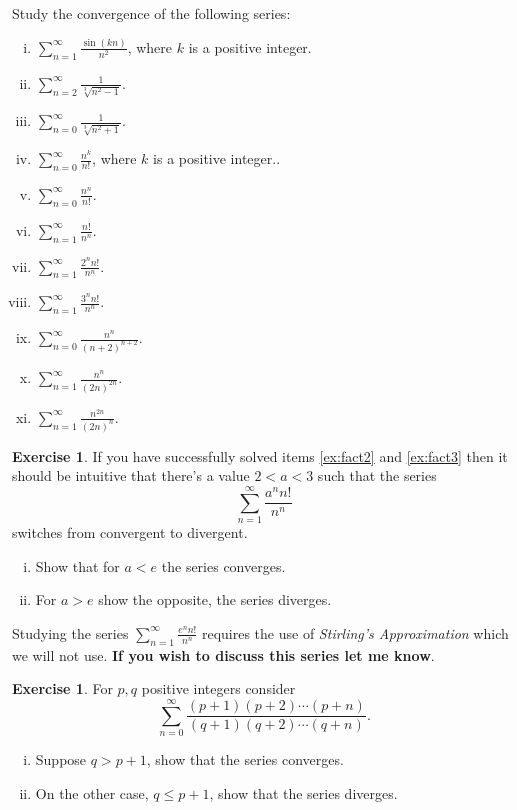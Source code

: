 \documentclass[12pt]{article}
\theoremstyle{plain}
\theoremstyle{definition}
\newtheorem{Ej}[Th]{Exercise}         %
\theoremstyle{remark}
\renewcommand{\leq}{\leqslant}      %
\renewcommand{\:}{\colon}           %
\renewcommand{\.}{\Cdot}                %
\begin{document}
\begin{multicols}{2}
Study the convergence of the following series:
\vspace*{-0.4em}
\begin{enumerate}[i)]
  \itemsep=-0.4em
  \item $\displaystyle\sum_{n=1}^\infty \frac{\sin(kn)}{n^2}$, where $k$ is a positive integer.%
  \item $\displaystyle\sum_{n=2}^\infty \frac{1}{\sqrt[3]{n^2-1}}$.%
  \item $\displaystyle\sum_{n=0}^\infty \frac{1}{\sqrt[3]{n^2+1}}$.%
  \item $\displaystyle\sum_{n=0}^\infty \frac{n^k}{n!}$, where $k$ is a positive integer..%
  \item $\displaystyle\sum_{n=0}^\infty \frac{n^n}{n!}$.%
  \item $\displaystyle\sum_{n=1}^\infty \frac{n!}{n^n}$.%
  \item $\displaystyle\sum_{n=1}^\infty \frac{2^nn!}{n^n}$.\label{ex:fact2}%
  \item $\displaystyle\sum_{n=1}^\infty \frac{3^nn!}{n^n}$.\label{ex:fact3}%
  \item $\displaystyle\sum_{n=0}^\infty \frac{n^n}{(n+2)^{n+2}}$.%
  \item $\displaystyle\sum_{n=1}^\infty \frac{n^n}{(2n)^{2n}}$.%
  \item $\displaystyle\sum_{n=1}^\infty \frac{n^{2n}}{(2n)^{n}}$.%
\end{enumerate}

\begin{Ej}
If you have successfully solved items \ref{ex:fact2} and \ref{ex:fact3} then it should be intuitive that there's a value $2<a<3$ such that the series 
$$\sum_{n=1}^\infty \frac{a^nn!}{n^n}$$
switches from convergent to divergent.
\vspace*{-0.4em}
  \begin{enumerate}[i)]
    \itemsep=-0.4em
  \item Show that for $a<e$ the series converges.
  \item For $a>e$ show the opposite, the series diverges.
\end{enumerate}
\end{Ej}

Studying the series $\displaystyle\sum_{n=1}^\infty \frac{e^nn!}{n^n}$ requires the use of \emph{Stirling's Approximation} which we will not use. \textbf{If you wish to discuss this series let me know}.
\begin{Ej}
  For $p,q$ positive integers consider
  $$\sum_{n=0}^\infty\frac{(p+1)(p+2)\cdots(p+n)}{(q+1)(q+2)\cdots(q+n)}.$$
  \vspace*{-0.4em}
  \begin{enumerate}[i)]
    \itemsep=-0.4em
    \item Suppose $q>p+1$, show that the series converges. 
    \item On the other case, $q\leq p+1$, show that the series diverges. 
  \end{enumerate}
\end{Ej}


\end{multicols}
\end{document}
